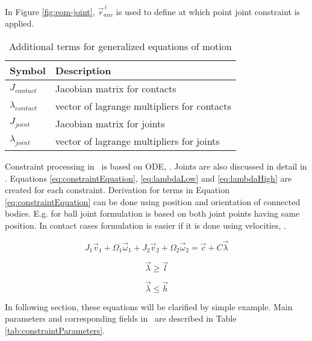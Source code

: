 In Figure \ref{fig:eom-joint}, $\vec{r}_{anc}^{\,i}$ is used to define at which point
joint constraint is applied.

\begin {table}[htb!]
\caption {Additional terms  for generalized equations of motion}
\label{tab:eom-g}
\begin{center}
\begin{tabular}{|l| l|}
\hline
{\bf Symbol} & {\bf Description} \\  \hline
$J_{contact}$ & Jacobian matrix for contacts  \\ \hline
$\lambda_{contact}$ & vector of lagrange multipliers for contacts  \\ \hline
$J_{joint}$ & Jacobian matrix for joints  \\ \hline
$\lambda_{joint}$ & vector of lagrange multipliers for joints  \\ \hline
\end {tabular}
\end{center}
\end {table}

Constraint processing in \bullet\ is based on ODE, \cite{ode}.
Joints are also discussed in detail in  
\citet{erleben.thesis}.
Equations \ref{eq:constraintEquation}, \ref{eq:lambdaLow} and
\ref{eq:lambdaHigh} 
are created for each constraint. 
Derivation for terms in Equation \ref{eq:constraintEquation}
can be done using position and orientation of connected bodies.
E.g. for ball joint formulation is based on both joint points having same position.
In contact cases formulation is easier if it is done using velocities, \cite{ode.joints}.

\begin{equation} \label{eq:constraintEquation}
J_1 \vec{v}_1 + \Omega_1 \vec{\omega}_1 + 
J_2 \vec{v}_2 + \Omega_2 \vec{\omega}_2 = \vec{c} + C \vec{\lambda}
\end{equation}

\begin{equation} \label{eq:lambdaLow}
\vec{\lambda} \geq \vec{l}
\end{equation}

\begin{equation} \label{eq:lambdaHigh}
\vec{\lambda} \leq \vec{h}
\end{equation}

In following section, these equations will be clarified by simple example.
Main parameters  and corresponding fields in \bullet\  
 are described in Table \ref{tab:constraintParameters}.

